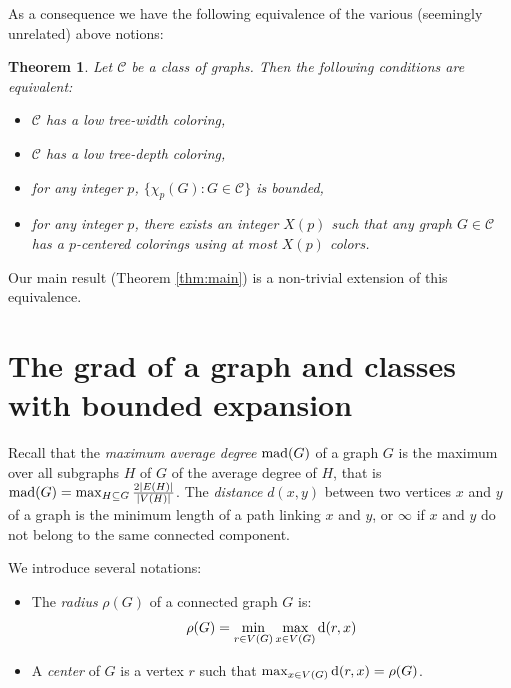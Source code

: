 \documentclass[a4paper]{amsart}
\newtheorem{theorem}{Theorem}[section]
\theoremstyle{definition}
\theoremstyle{remark}
\DeclareMathOperator\mad{{\rm mad}}
\begin{document}
As a consequence we have the following equivalence of the various (seemingly unrelated) above notions:
\begin{theorem}
\label{th:equiv1}
Let $\mathcal C$ be a class of graphs. Then the following conditions
are equivalent:
\begin{itemize}
\item $\mathcal C$ has a low tree-width coloring,
\item $\mathcal C$ has a low tree-depth coloring,
\item for any integer $p$, $\{\chi_p(G): G\in\mathcal C\}$ is bounded,
\item for any integer $p$, there exists an integer $X(p)$ such that
any graph $G\in\mathcal C$ has a $p$-centered colorings using at most
$X(p)$ colors.
\end{itemize}
\end{theorem}

Our main result (Theorem \ref{thm:main}) is a non-trivial extension of this equivalence.

\section{The grad of a graph and classes with bounded expansion}
\label{sec:grad}
Recall that the {\em maximum average degree} $\mad(G)$ of a graph $G$ is
the maximum over all subgraphs $H$ of $G$ of the average degree of $H$, that is
$\mad(G)=\max_{H\subseteq G}\frac{2|E(H)|}{|V(H)|}$. The {\em
  distance} $d(x,y)$ between two vertices $x$ and $y$ of a graph is the minimum
length of a path linking $x$ and $y$, or $\infty$ if $x$ and $y$ do not
belong to the same connected component.


We introduce several notations:

\begin{itemize}
\item 
The {\em radius} $\rho(G)$ of a connected graph $G$ is:
\begin{equation*}
\rho(G)=\min_{r\in V(G)}\max_{x\in V(G)} {\rm d}(r,x)
\end{equation*}
\item
 A {\em center} of $G$ is a vertex $r$ such that $\max_{x\in V(G)}{\rm
  d}(r,x)=\rho(G)$.
\end{itemize}
\end{document}
